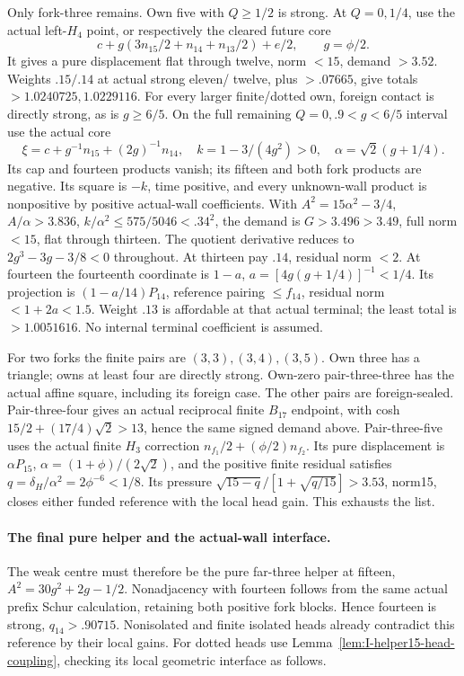 \documentclass[11pt]{article}
\theoremstyle{definition}
\theoremstyle{remark}
\begin{document}
Only fork-three remains. Own five with \(Q\ge1/2\) is strong.
At \(Q=0,1/4\), use the actual left-\(H_4\) point, or respectively
the cleared future core
\[
 c+g(3n_{15}/2+n_{14}+n_{13}/2)+e/2,\qquad g=\phi/2.
\]
It gives a pure displacement flat through twelve, norm \(<15\),
demand \(>3.52\). Weights \(.15/.14\) at actual strong eleven/
twelve, plus \(>.07665\), give totals \(>1.0240725,1.0229116\).
For every larger finite/dotted own, foreign contact is directly strong,
as is \(g\ge6/5\). On the full remaining \(Q=0,.9<g<6/5\)
interval use the actual core
\[
 \xi=c+g^{-1}n_{15}+(2g)^{-1}n_{14},\quad
 k=1-3/(4g^2)>0,\quad \alpha=\sqrt2(g+1/4).
\]
Its cap and fourteen products vanish; its fifteen and both fork
products are negative. Its square is \(-k\), time positive, and
every unknown-wall product is nonpositive by positive actual-wall
coefficients. With \(A^2=15\alpha^2-3/4\),
\(A/\alpha>3.836\), \(k/\alpha^2\le575/5046<.34^2\), the demand
is \(G>3.496>3.49\), full norm \(<15\), flat through thirteen.
The quotient derivative reduces to \(2g^3-3g-3/8<0\) throughout.
At thirteen pay \(.14\), residual norm \(<2\). At fourteen the
fourteenth coordinate is \(1-a\),
\(a=[4g(g+1/4)]^{-1}<1/4\). Its projection is
\((1-a/14)P_{14}\), reference pairing \(\le f_{14}\), residual
norm \(<1+2a<1.5\). Weight \(.13\) is affordable at that actual
terminal; the least total is \(>1.0051616\). No internal terminal
coefficient is assumed.

For two forks the finite pairs are \((3,3),(3,4),(3,5)\).
Own three has a triangle; owns at least four are directly strong.
Own-zero pair-three-three has the actual affine square, including its
foreign case. The other pairs are foreign-sealed. Pair-three-four
gives an actual reciprocal finite \(B_{17}\) endpoint, with
cosh \(15/2+(17/4)\sqrt2>13\), hence the same signed demand above.
Pair-three-five uses the actual finite \(H_3\) correction
\(n_{f_1}/2+(\phi/2)n_{f_2}\). Its pure displacement is
\(\alpha P_{15}\), \(\alpha=(1+\phi)/(2\sqrt2)\), and the
positive finite residual satisfies \(q=\delta_H/\alpha^2=2\phi^{-6}<1/8\).
Its pressure
\(\sqrt{15-q}/[1+\sqrt{q/15}]>3.53\), norm15, closes either
funded reference with the local head gain. This exhausts the list.

\paragraph{The final pure helper and the actual-wall interface.}
The weak centre must therefore be the pure far-three helper at fifteen,
\(A^2=30g^2+2g-1/2\). Nonadjacency with fourteen follows from the
same actual prefix Schur calculation, retaining both positive fork
blocks. Hence fourteen is strong, \(q_{14}>.90715\). Nonisolated
and finite isolated heads already contradict this reference by their
local gains. For dotted heads use
Lemma~\ref{lem:I-helper15-head-coupling}, checking its local geometric
interface as follows.
\end{document}
